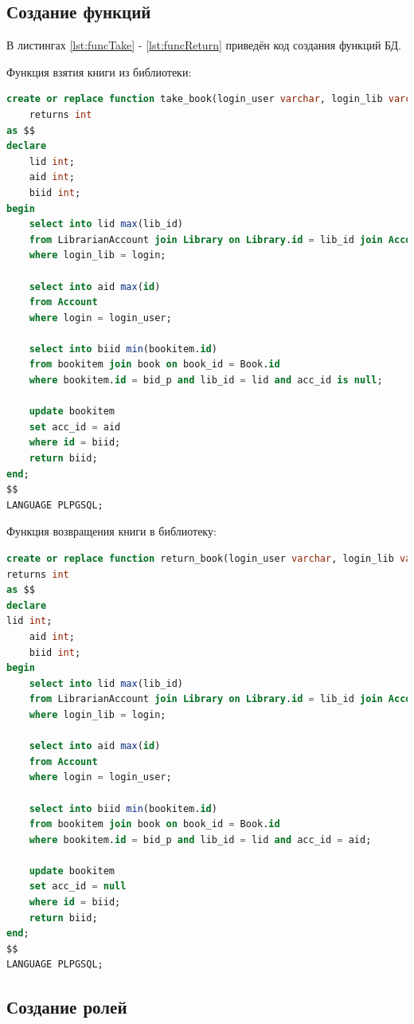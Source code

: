 \subsection{Создание функций}
В листингах \ref{lst:funcTake} - \ref{lst:funcReturn} приведён код создания функций БД. 

\noindent Функция взятия книги из библиотеки:
\begin{lstlisting}[label=lst:funcTake, caption=Создание функции взятия книги, language=sql]
create or replace function take_book(login_user varchar, login_lib varchar, bid_p int)
    returns int
as $$
declare
    lid int;
	aid int;
	biid int;
begin
    select into lid max(lib_id)
    from LibrarianAccount join Library on Library.id = lib_id join Account on acc_id = Account.id
    where login_lib = login;

    select into aid max(id)
    from Account
    where login = login_user;

    select into biid min(bookitem.id)
    from bookitem join book on book_id = Book.id
    where bookitem.id = bid_p and lib_id = lid and acc_id is null;

    update bookitem
    set acc_id = aid
    where id = biid;
    return biid;
end;
$$
LANGUAGE PLPGSQL;
\end{lstlisting}
\newpage
\noindent Функция возвращения книги в библиотеку:
\begin{lstlisting}[label=lst:funcReturn, caption=Создание функции возвращения книги, language=sql]
create or replace function return_book(login_user varchar, login_lib varchar, bid_p int)
returns int
as $$
declare
lid int;
	aid int;
	biid int;
begin
    select into lid max(lib_id)
    from LibrarianAccount join Library on Library.id = lib_id join Account on acc_id = Account.id
    where login_lib = login;

    select into aid max(id)
    from Account
    where login = login_user;

    select into biid min(bookitem.id)
    from bookitem join book on book_id = Book.id
    where bookitem.id = bid_p and lib_id = lid and acc_id = aid;

    update bookitem
    set acc_id = null
    where id = biid;
    return biid;
end;
$$
LANGUAGE PLPGSQL;
\end{lstlisting}

\subsection{Создание ролей}

